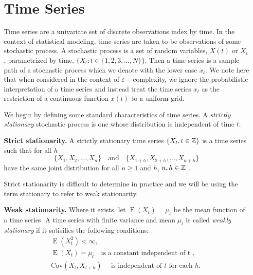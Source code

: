 
\section{Time Series}
  
  Time series are a univariate set of discrete observations index by time. In the context of statistical modeling, 
  time series are taken to be observations of some stochastic process. 
  A stochastic process is a set of random 
  variables, $X(t)$ or $X_t$, parametrized by time, 
  $\{ X_t: t \in \{ 1,2,3,...,N\}\}$.  
  Then a time series is a sample path of a 
   stochastic process which we denote with the lower case $x_t$. 
   We note here that when considered 
   in the context of $\varepsilon-$complexity, we 
   ignore the probabilistic interpretation of a 
   time series and instead
   treat the time series $x_t$ as the restriction of 
   a continuous function $x(t)$ to a uniform grid.

   We begin by defining some standard characteristics of time series. 
   A \textit{strictly stationary} 
   stochastic process is one 
   whose distribution is independent of time $t$. 
   \begin{defn}{\textbf{Strict stationarity.}} A strictly stationary time series 
   $\{ X_t, t \in \mathbb{Z}  \}$ is a time series
   such that for all $h$ 
   \[
     \{ X_1, X_2, ..., X_n \} \hspace{1em}
     \text{and}
      \hspace{1em}
     \{ X_{1+h}, X_{2+h}, ..., X_{n+h} \}
   \]
   have the same joint distribution for all $n \geq 1$ and $h$, 
   $n, h \in \mathbb{Z}$ \cite{fan2003}.
   \end{defn}
  Strict stationarity is difficult to determine in practice 
  and we will be using the term stationary to refer to 
  weak stationarity.
  \begin{defn}\label{def:stationary}{\textbf{Weak stationarity.} }
   Where it exists, let $\mathop{E}(X_t)  = \mu_{t}$ be the mean function of a time series.
   A  time series with finite variance and 
  mean $\mu_t$ is called 
   \textit{weakly stationary} if it satisifies the following 
   conditions: 
  \begin{align*}
    &\mathop{E}(X_t^2) < \infty, \\
    &\mathop{E}(X_t)  = \mu_t \hspace{1em} \text{is a constant 
    independent of t },\hspace{1em} \\
    &\text{Cov}(X_t, X_{t+ h }) \hspace{1em}\text{ is independent
    of } t \text{ for each } h .\hspace{1em} 
  \end{align*}   
  \end{defn}
  
